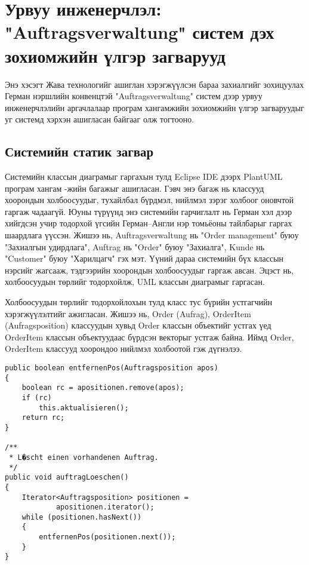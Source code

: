 \section{Урвуу инженерчлэл: "Auftragsverwaltung" систем дэх зохиомжийн үлгэр загварууд}
Энэ хэсэгт Жава технологийг ашиглан хэрэгжүүлсэн бараа захиалгийг зохицуулах Герман нэршлийн конвенцтэй "Auftragsverwaltung" систем дээр урвуу инженерчлэлийн аргачлалаар програм хангамжийн зохиомжийн үлгэр загваруудыг уг системд хэрхэн ашигласан байгааг олж тогтооно.

\subsection{Системийн статик загвар}
Системийн классын диаграмыг гаргахын тулд Eclipse IDE дээрх PlantUML програм хангам -жийн багажыг ашигласан. Гэвч энэ багаж нь классууд хоорондын холбоосуудыг, тухайлбал бүрдмэл, нийлмэл зэрэг холбоог оновчтой гаргаж чадаагүй. Юуны түрүүнд энэ системийн гарчиглалт нь Герман хэл дээр хийгдсэн учир тодорхой үгсийн Герман–Англи нэр томьёоны тайлбарыг гаргах шаардлага үүссэн. Жишээ нь, Auftragsverwaltung нь "Order management" буюу "Захиалгын удирдлага", Auftrag нь "Order" буюу "Захиалга", Kunde нь "Customer" буюу "Харилцагч" гэх мэт. Үүний дараа системийн бүх классын нэрсийг жагсааж, тэдгээрийн хоорондын холбоосуудыг гаргаж авсан. Эцэст нь, холбоосуудын төрлийг тодорхойлж, UML классын диаграмыг гаргасан.


Холбоосуудын төрлийг тодорхойлохын тулд класс тус бүрийн устгагчийн хэрэгжүүлэлтийг ажигласан. Жишээ нь, Order (Aufrag), OrderItem (Aufragsposition) классуудын хувьд Order классын объектийг устгах үед OrderItem классын объектуудаас бүрдсэн векторыг устгаж байна. Иймд Order, OrderItem классууд хоорондоо нийлмэл холбоотой гэж дүгнэлээ.
\begin{lstlisting}
public boolean entfernenPos(Auftragsposition apos)
{
    boolean rc = apositionen.remove(apos);
    if (rc)
        this.aktualisieren();
    return rc;
}

/**
 * L�scht einen vorhandenen Auftrag.
 */
public void auftragLoeschen()
{
    Iterator<Auftragsposition> positionen =
            apositionen.iterator();
    while (positionen.hasNext())
    {
        entfernenPos(positionen.next());
    }
}
\end{lstlisting}


\begin{lstlisting}
\end{lstlisting}